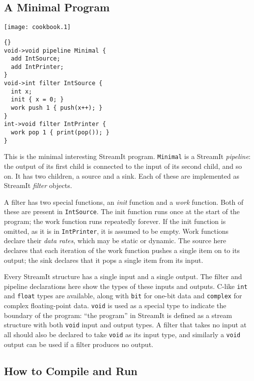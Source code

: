 \smallskip \subsection{A Minimal Program}

\begin{textpic}{\texttt{[image: cookbook.1]}}
\begin{lstlisting}{}
void->void pipeline Minimal {
  add IntSource;
  add IntPrinter;
}
void->int filter IntSource {
  int x;
  init { x = 0; }
  work push 1 { push(x++); }
}
int->void filter IntPrinter {
  work pop 1 { print(pop()); }
}
\end{lstlisting}
\end{textpic}

This is the minimal interesting StreamIt program.  \lstinline|Minimal|
is a StreamIt \emph{pipeline}: the output of its first child is
connected to the input of its second child, and so on.  It has two
children, a source and a sink.  Each of these are implemented as
StreamIt \emph{filter} objects.

A filter has two special functions, an \emph{init} function and a
\emph{work} function.  Both of these are present in
\lstinline|IntSource|.  The init function runs once at the start of
the program; the work function runs repeatedly forever.  If the init
function is omitted, as it is in \lstinline|IntPrinter|, it is assumed
to be empty.  Work functions declare their \emph{data rates}, which
may be static or dynamic.  The source here declares that each
iteration of the work function pushes a single item on to its output;
the sink declares that it pops a single item from its input.

Every StreamIt structure has a single input and a single output.  The
filter and pipeline declarations here show the types of these inputs
and outputs.  C-like \lstinline|int| and \lstinline|float| types are
available, along with \lstinline|bit| for one-bit data and
\lstinline|complex| for complex floating-point data.  \lstinline|void|
is used as a special type to indicate the boundary of the program:
``the program'' in StreamIt is defined as a stream structure with both
\lstinline|void| input and output types.  A filter that takes no input
at all should also be declared to take \lstinline|void| as its input
type, and similarly a \lstinline|void| output can be used if a filter
produces no output.

\subsection*{How to Compile and Run}

